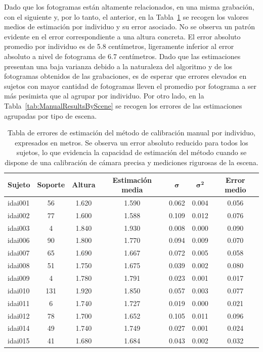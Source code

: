 Dado que los fotogramas están altamente relacionados, en una misma grabación, con el siguiente y, por lo tanto, el anterior, en la Tabla~\ref{tab:ManualResultsBySubject} se
recogen los valores medios de estimación por individuo y su error asociado.
No se observa un patrón evidente en el error correspondiente a una altura concreta.
El error absoluto promedio por individuo es de 5.8 centímetros, ligeramente inferior al error absoluto a nivel de fotograma de 6.7 centímetros.
Dado que las estimaciones presentan una baja varianza debido a la naturaleza del algoritmo y de los fotogramas obtenidos de las grabaciones,
es de esperar que errores elevados en sujetos con mayor cantidad de fotogramas lleven el promedio por fotograma a ser más pesimista
que al agrupar por individuo. Por otro lado, en la Tabla~\ref{tab:ManualResultsByScene}
se recogen los errores de las estimaciones agrupadas por tipo de escena.

\begin{table}[!ht]
  \scriptsize
  \centering
\begin{tabular}{|l|c|c|c|c|c|c|}
\hline
\rowcolor[HTML]{FFCB2F}
\textbf{Sujeto}&\textbf{ Soporte }&\textbf{ Altura }&\textbf{ Estimación media }& $\bm{\sigma}$ & $\bm{\sigma^2}$ &\textbf{ Error medio } \\
\hline
idai001 & 56 & 1.620 & 1.590 & 0.062 & 0.004 & 0.056 \\
\hline
idai002 & 77 & 1.600 & 1.588 & 0.109 & 0.012 & 0.076 \\
\hline
idai003 & 4 & 1.840 & 1.930 & 0.008 & 0.000 & 0.090 \\
\hline
idai006 & 90 & 1.800 & 1.770 & 0.094 & 0.009 & 0.070 \\
\hline
idai007 & 65 & 1.690 & 1.667 & 0.072 & 0.005 & 0.058 \\
\hline
idai008 & 51 & 1.750 & 1.675 & 0.039 & 0.002 & 0.080 \\
\hline
idai009 & 4 & 1.780 & 1.791 & 0.023 & 0.001 & 0.017 \\
\hline
idai010 & 131 & 1.920 & 1.850 & 0.057 & 0.003 & 0.077 \\
\hline
idai011 & 6 & 1.740 & 1.727 & 0.019 & 0.000 & 0.021 \\
\hline
idai012 & 78 & 1.700 & 1.652 & 0.105 & 0.011 & 0.096 \\
\hline
idai014 & 49 & 1.740 & 1.749 & 0.027 & 0.001 & 0.024 \\
\hline
idai015 & 41 & 1.680 & 1.684 & 0.043 & 0.002 & 0.032 \\
\hline
\end{tabular}
\caption[Tabla de errores de estimación del método de calibración manual por individuo, expresados en metros.]{
  Tabla de errores de estimación del método de calibración manual por individuo, expresados en metros.
  Se observa un error absoluto reducido para todos los sujetos, lo que evidencia la capacidad
  de estimación del método cuando se dispone de una calibración de cámara precisa y mediciones rigurosas de la escena.
}\label{tab:ManualResultsBySubject}
\end{table}

